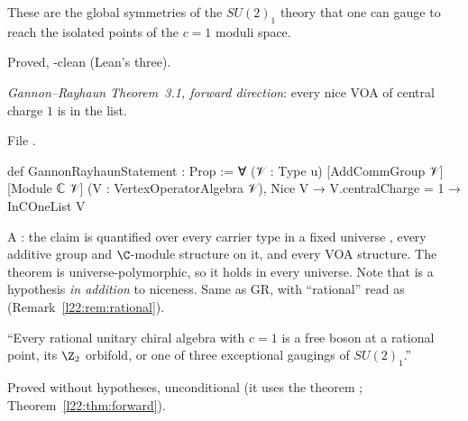 \begin{physics}
These are the global symmetries of the $SU(2)_1$ theory that one can gauge to reach the isolated points of
the $c=1$ moduli space.
\end{physics}

\begin{status}
Proved, -clean (Lean's three).
\end{status}

\begin{definition}\label{l22:def:GRS}
\emph{Gannon--Rayhaun Theorem~3.1, forward direction}: every nice VOA of central charge $1$ is in the list.
\end{definition}
\noindent File .
\begin{leancode}
def GannonRayhaunStatement : Prop :=
  ∀ (𝒱 : Type u) [AddCommGroup 𝒱] [Module ℂ 𝒱] (V : VertexOperatorAlgebra 𝒱),
    Nice V → V.centralCharge = 1 → InCOneList V
\end{leancode}

\begin{dictionary}
A : the claim is quantified over every carrier type  in a fixed universe , every
additive group and $\C$-module structure on it, and every VOA structure. The theorem
 is universe-polymorphic, so it holds in every
universe. Note that  is a hypothesis \emph{in addition} to niceness. Same as GR, with
``rational'' read as  (Remark~\ref{l22:rem:rational}).
\end{dictionary}

\begin{physics}
``Every rational unitary chiral algebra with $c=1$ is a free boson at a rational point, its $\Z_2$ orbifold, or
one of three exceptional gaugings of $SU(2)_1$.''
\end{physics}

\begin{status}
Proved without hypotheses, unconditional (it uses the theorem ; Theorem~\ref{l22:thm:forward}).
\end{status}

